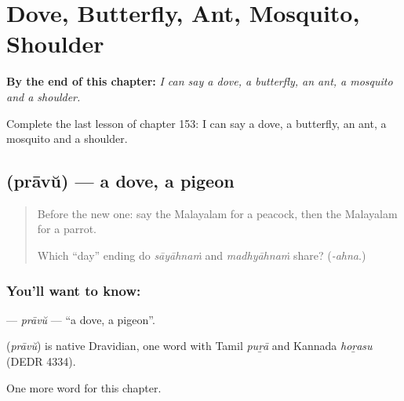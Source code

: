 
\chapter{Dove, Butterfly, Ant, Mosquito, Shoulder}
\label{ch:ml-dove-butterfly-ant-mosquito-shoulder}

\begin{chapteropening}
\textbf{By the end of this chapter:} \emph{I can say a dove, a butterfly, an ant, a mosquito and a shoulder.}

Complete the last lesson of chapter 153: I can say a dove, a butterfly, an ant, a mosquito and a shoulder.
\end{chapteropening}

\section[\texorpdfstring{\ml{പ്രാവ്} (prāvŭ)}{പ്രാവ് (prāvŭ)}]{ (prāvŭ) — a dove, a pigeon}

\label{lesson:ML-C153-pravu}



\begin{quote}
Before the new one: say the Malayalam for a peacock, then the Malayalam for a parrot.

Which \textquotedblleft{}day\textquotedblright{} ending do \emph{sāyāhnaṁ} and \emph{madhyāhnaṁ} share? (\emph{-ahna}.)
\end{quote}

\subsection*{You'll want to know: }
\textbf{} — \emph{prāvŭ} — \textquotedblleft{}a dove, a pigeon\textquotedblright{}.

\begin{cousinweb}
\textbf{} (\emph{prāvŭ}) is native Dravidian, one word with Tamil \emph{puṟā} and Kannada \emph{hoṟasu} (DEDR 4334).
\end{cousinweb}

\begin{grammarlens}[title={What you've built}]
One more word for this chapter.
\end{grammarlens}

